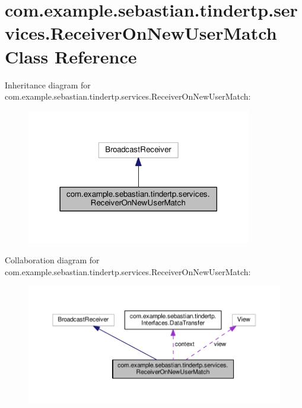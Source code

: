 \hypertarget{classcom_1_1example_1_1sebastian_1_1tindertp_1_1services_1_1ReceiverOnNewUserMatch}{}\section{com.\+example.\+sebastian.\+tindertp.\+services.\+Receiver\+On\+New\+User\+Match Class Reference}
\label{classcom_1_1example_1_1sebastian_1_1tindertp_1_1services_1_1ReceiverOnNewUserMatch}


Inheritance diagram for com.\+example.\+sebastian.\+tindertp.\+services.\+Receiver\+On\+New\+User\+Match\+:\nopagebreak
\begin{figure}[H]
\begin{center}
\leavevmode
\includegraphics[width=278pt]{classcom_1_1example_1_1sebastian_1_1tindertp_1_1services_1_1ReceiverOnNewUserMatch__inherit__graph}
\end{center}
\end{figure}


Collaboration diagram for com.\+example.\+sebastian.\+tindertp.\+services.\+Receiver\+On\+New\+User\+Match\+:\nopagebreak
\begin{figure}[H]
\begin{center}
\leavevmode
\includegraphics[width=350pt]{classcom_1_1example_1_1sebastian_1_1tindertp_1_1services_1_1ReceiverOnNewUserMatch__coll__graph}
\end{center}
\end{figure}
